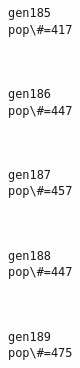 \documentclass[11pt]{article}
\begin{document}
    \begin{Verbatim}[commandchars=\\\{\}]
gen185
pop\#=417

    \end{Verbatim}

    \begin{center}
    \end{center}
    { \hspace*{\fill} \\}
    
    \begin{Verbatim}[commandchars=\\\{\}]
gen186
pop\#=447

    \end{Verbatim}

    \begin{center}
    \end{center}
    { \hspace*{\fill} \\}
    
    \begin{Verbatim}[commandchars=\\\{\}]
gen187
pop\#=457

    \end{Verbatim}

    \begin{center}
    \end{center}
    { \hspace*{\fill} \\}
    
    \begin{Verbatim}[commandchars=\\\{\}]
gen188
pop\#=447

    \end{Verbatim}

    \begin{center}
    \end{center}
    { \hspace*{\fill} \\}
    
    \begin{Verbatim}[commandchars=\\\{\}]
gen189
pop\#=475

    \end{Verbatim}
\end{document}
